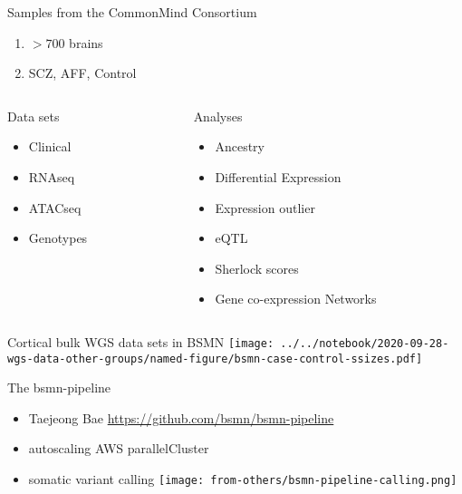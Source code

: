 \documentclass{beamer}
\begin{document}
\begin{frame}{Samples from the CommonMind Consortium}
\begin{enumerate}
\item \(> 700\) brains
\item SCZ, AFF, Control
\end{enumerate}
\vfill
\begin{columns}[t]
\begin{column}{0.5\textwidth}
Data sets
\begin{itemize}
\item Clinical
\item RNAseq
\item ATACseq
\item Genotypes
\end{itemize}
\end{column}

\begin{column}{0.5\textwidth}
Analyses
\begin{itemize}
\item Ancestry
\item Differential Expression
\item Expression outlier
\item eQTL
\item Sherlock scores
\item Gene co-expression Networks
\end{itemize}
\end{column}
\end{columns}

\end{frame}

\begin{frame}{Cortical bulk WGS data sets in BSMN}
\texttt{[image: ../../notebook/2020-09-28-wgs-data-other-groups/named-figure/bsmn-case-control-ssizes.pdf]}
\end{frame}

\begin{frame}{The bsmn-pipeline}
\begin{itemize}
\item Taejeong Bae \url{https://github.com/bsmn/bsmn-pipeline}
\item autoscaling AWS parallelCluster
\item somatic variant calling
\texttt{[image: from-others/bsmn-pipeline-calling.png]}
\end{itemize}
\end{frame}
\end{document}
